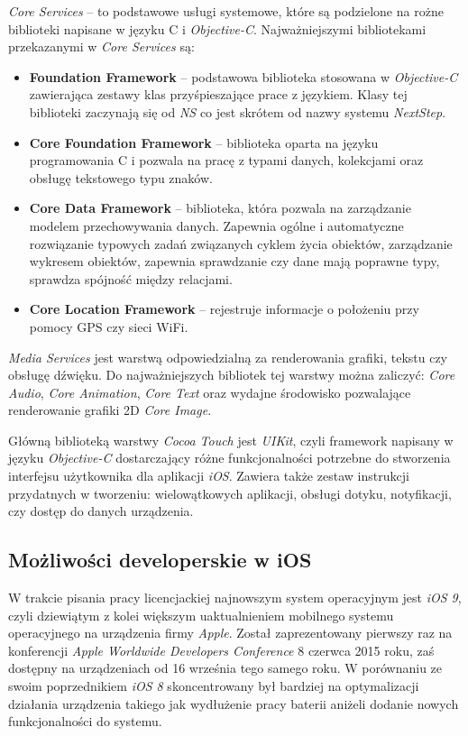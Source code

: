 \documentclass{iiuwb}
\begin{document}
\textit{Core Services} -- to podstawowe usługi systemowe, które są podzielone na rożne biblioteki napisane w języku C i \textit{Objective-C}. Najważniejszymi bibliotekami przekazanymi w \textit{Core Services} są:
\begin{itemize}
\item \textbf{Foundation Framework} -- podstawowa biblioteka stosowana w \textit{Objective-C} zawierająca zestawy klas przyśpieszające prace z językiem. Klasy tej biblioteki zaczynają się od  \textit{NS} co jest skrótem od nazwy systemu \textit{NextStep}.
\item \textbf{Core Foundation Framework} -- biblioteka oparta na języku programowania C i pozwala na pracę z typami danych, kolekcjami oraz obsługę tekstowego typu znaków.
\item \textbf{Core Data Framework} -- biblioteka, która pozwala na zarządzanie modelem przechowywania danych. Zapewnia ogólne i automatyczne rozwiązanie typowych zadań związanych cyklem życia obiektów, zarządzanie wykresem obiektów, zapewnia sprawdzanie czy dane mają poprawne typy, sprawdza spójność między relacjami.
\item \textbf{Core Location Framework} -- rejestruje informacje o położeniu przy pomocy GPS czy sieci WiFi.
\end{itemize} 
\textit{Media Services} jest warstwą odpowiedzialną za renderowania grafiki, tekstu czy obsługę dźwięku. Do najważniejszych bibliotek tej warstwy można zaliczyć: \textit{Core Audio}, \textit{Core Animation}, \textit{Core Text} oraz wydajne środowisko pozwalające renderowanie grafiki 2D \textit{Core Image}.

Główną biblioteką warstwy \textit{Cocoa Touch} jest \textit{UIKit}, czyli framework napisany w języku \textit{Objective-C} dostarczający różne funkcjonalności potrzebne do stworzenia interfejsu użytkownika dla aplikacji \textit{iOS}. Zawiera także zestaw instrukcji przydatnych w tworzeniu: wielowątkowych aplikacji, obsługi dotyku, notyfikacji, czy dostęp do danych urządzenia.

\subsection{Możliwości developerskie w iOS}
W trakcie pisania pracy licencjackiej najnowszym system operacyjnym jest \textit{iOS 9}, czyli dziewiątym z kolei większym uaktualnieniem mobilnego systemu operacyjnego na urządzenia firmy \textit{Apple}. Został zaprezentowany pierwszy raz na konferencji \textit{Apple Worldwide Developers Conference} 8 czerwca  2015 roku, zaś dostępny na urządzeniach od 16 września tego samego roku. W porównaniu ze swoim poprzednikiem \textit{iOS 8} skoncentrowany był bardziej na optymalizacji działania urządzenia takiego jak wydłużenie pracy baterii aniżeli dodanie nowych funkcjonalności do systemu. 
\end{document}

